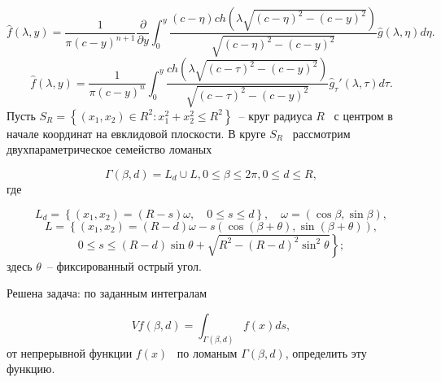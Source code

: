 \bigskip

\begin{equation*}
\widehat  f\left(\lambda ,y\right)=\frac 1{\pi \left(c-y\right)^{n+1}}\frac{{\partial}}{{\partial}y}\int
_0^y\frac{\left(c-\eta \right)\mathit{ch}\left(\lambda \sqrt{\left(c-\eta
		\right)^2-\left(c-y\right)^2}\right)}{\sqrt{\left(c-\eta \right)^2-\left(c-y\right)^2}}\widehat  g\left(\lambda ,\eta
\right)\mathit{d\eta }.
\end{equation*}
\begin{equation*}
\widehat  f\left(\lambda ,y\right)=\frac 1{\pi \left(c-y\right)^n}\int _0^y\frac{\mathit{ch}\left(\lambda
	\sqrt{\left(c-\tau \right)^2-\left(c-y\right)^2}\right)}{\sqrt{\left(c-\tau \right)^2-\left(c-y\right)^2}}\widehat 
g_{\tau }'\left(\lambda ,\tau \right)d\tau .
\end{equation*}
Пусть  $S_R=\left\{\left(x_1,x_2\right){\in}R^2:x_1^2+x_2^2{\leq}R^2\right\}$\ – круг радиуса  $R$ \ с центром в
начале координат на евклидовой плоскости. В круге  $S_R$ \ рассмотрим двухпараметрическое семейство ломаных 

\begin{equation*}
\Gamma \left(\beta ,d\right)=L_d{\cup}L,0{\leq}\beta {\leq}2\pi ,0{\leq}d{\leq}R,
\end{equation*}
где 

\begin{equation*}
L_d=\left\{\left(x_1,x_2\right)=\left(R-s\right)\omega ,\quad 0{\leq}s{\leq}d\right\},\quad \omega
=(\cos \beta ,\sin \beta ),
\end{equation*}
\begin{equation*}
L=\left\{\left(x_1,x_2\right)=\left(R-d\right)\omega -s\left(\cos \left(\beta +\theta \right),\sin \left(\beta +\theta
\right)\right),\right.
\end{equation*}
\begin{equation*}
\left.0{\leq}s{\leq}\left(R-d\right)\sin \theta +\sqrt{R^2-\left(R-d\right)^2\sin ^2\theta }\right\};
\end{equation*}
здесь  $\theta $\ – фиксированный острый угол.

Решена задача: по заданным интегралам 

\begin{equation*}
\mathit{Vf}\left(\beta ,d\right)=\int _{\Gamma \left(\beta ,d\right)}^{}f(x)\mathit{ds},
\end{equation*}
от непрерывной функции  $f(x)$ \ по ломаным  $\Gamma \left(\beta ,d\right)$, определить эту функцию.

